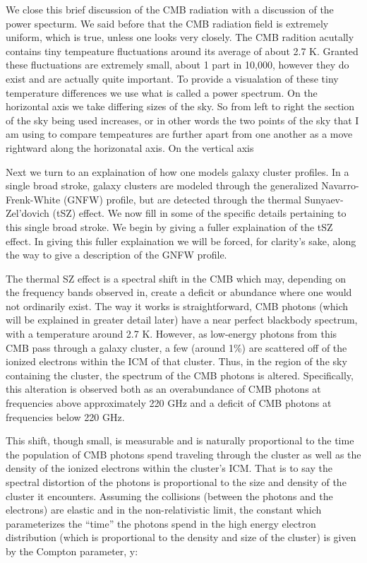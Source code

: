 \documentclass[12pt]{article} %
\begin{document}
We close this brief discussion of the CMB radiation with a discussion of the power specturm. We said before that the CMB radiation field is extremely uniform, which is true, unless one looks very closely. The CMB radition acutally contains tiny tempeature fluctuations around its average of about 2.7 K. Granted these fluctuations are extremely small, about 1 part in 10,000, however they do exist and are actually quite important. To provide a visualation of these tiny temperature differences we use what is called a power spectrum.  On the horizontal axis we take differing sizes of the sky. So from left to right the section of the sky being used increases, or in other words the two points of the sky that I am using to compare tempeatures are further apart from one another as a move rightward along the horizonatal axis. On the vertical axis

Next we turn to an explaination of how one models galaxy cluster profiles. In a single broad stroke, galaxy clusters are modeled through the generalized Navarro-Frenk-White (GNFW) profile, but are detected through the thermal Sunyaev-Zel'dovich (tSZ) effect. We now fill in some of the specific details pertaining to this single broad stroke. We begin by giving a fuller explaination of the tSZ effect. In giving this fuller explaination we will be forced, for clarity's sake, along the way to give a description of the GNFW profile. 

The thermal SZ effect is a spectral shift in the CMB which may, depending on the frequency bands observed in, create a deficit or abundance where one would not ordinarily exist. The way it works is straightforward, CMB photons (which will be explained in greater detail later) have a near perfect blackbody spectrum, with a temperature around 2.7 K. However, as low-energy photons from this CMB pass through a galaxy cluster, a few (around 1\%) are scattered off of the ionized electrons within the ICM of that cluster. Thus, in the region of the sky containing the cluster, the spectrum of the CMB photons is altered. Specifically, this alteration is observed both as an overabundance of CMB photons at frequencies above approximately 220 GHz and a deficit of CMB photons at frequencies below 220 GHz. 

This shift, though small, is measurable and is naturally proportional to the time the population of CMB photons spend traveling through the cluster as well as the density of the ionized electrons within the cluster’s ICM. That is to say the spectral distortion of the photons is proportional to the size and density of the cluster it encounters. Assuming the collisions (between the photons and the electrons) are elastic and in the non-relativistic limit, the constant which parameterizes the “time” the photons spend in the high energy electron distribution (which is proportional to the density and size of the cluster) is given by the Compton parameter, y: 
\end{document}
